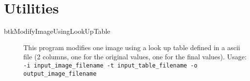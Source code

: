 \section{Utilities}


\begin{description}
 \item[btkModifyImageUsingLookUpTable] This program modifies one image using a look up table defined in a ascii file (2 columns, one for the original values, one for the final values). Usage: \texttt{-i input\_image\_filename -t input\_table\_filename -o output\_image\_filename}
\end{description}
